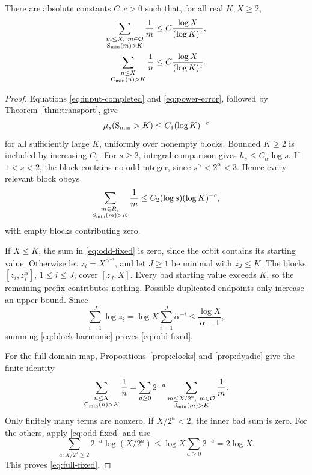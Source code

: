 \begin{theorem}
\label{thm:fixed}
There are absolute constants $C,c>0$ such that, for all real $K,X\geq2$,
\begin{align}
 \sum_{\substack{m\leq X,\ m\in\mathcal O\\\mathrm S_{\min}(m)>K}}\frac1m
 &\leq C\frac{\log X}{(\log K)^c},\label{eq:odd-fixed}\\
 \sum_{\substack{n\leq X\\\mathrm C_{\min}(n)>K}}\frac1n
 &\leq C\frac{\log X}{(\log K)^c}.\label{eq:full-fixed}
\end{align}
\end{theorem}
\begin{proof}
Equations \eqref{eq:input-completed} and \eqref{eq:power-error}, followed
by Theorem~\ref{thm:transport}, give
\[
 \mu_s(\mathrm S_{\min}>K)\leq C_1(\log K)^{-c}
\]
for all sufficiently large $K$, uniformly over nonempty blocks.  Bounded
$K\geq2$ is included by increasing $C_1$.
For $s\geq2$, integral comparison gives $h_s\leq C_\alpha\log s$.
If $1<s<2$, the block contains no odd integer, since $s^\alpha<2^\alpha<3$.
Hence every relevant block obeys
\begin{equation}\label{eq:block-harmonic}
 \sum_{\substack{m\in R_s\\\mathrm S_{\min}(m)>K}}\frac1m
 \leq C_2(\log s)(\log K)^{-c},
\end{equation}
with empty blocks contributing zero.

If $X\leq K$, the sum in \eqref{eq:odd-fixed} is zero, since the orbit
contains its starting value.  Otherwise let $z_i=X^{\alpha^{-i}}$, and
let $J\geq1$ be minimal with $z_J\leq K$.  The blocks
$[z_i,z_i^\alpha]$, $1\leq i\leq J$, cover $[z_J,X]$.
Every bad starting value exceeds $K$, so the remaining prefix contributes
nothing.  Possible duplicated endpoints only increase an upper bound.
Since
\[
 \sum_{i=1}^J\log z_i
 =\log X\sum_{i=1}^J\alpha^{-i}
 \leq\frac{\log X}{\alpha-1},
\]
summing \eqref{eq:block-harmonic} proves \eqref{eq:odd-fixed}.

For the full-domain map, Propositions~\ref{prop:clocks} and
\ref{prop:dyadic} give the finite identity
\[
 \sum_{\substack{n\leq X\\\Col_{\min}(n)>K}}\frac1n
 =\sum_{a\geq0}2^{-a}
   \sum_{\substack{m\leq X/2^a,\ m\in\Opos\\\Syr_{\min}(m)>K}}\frac1m.
\]
Only finitely many terms are nonzero.  If $X/2^a<2$, the inner bad sum is
zero.  For the others, apply \eqref{eq:odd-fixed} and use
\[
 \sum_{a:X/2^a\geq2}2^{-a}\log(X/2^a)
 \leq\log X\sum_{a\geq0}2^{-a}=2\log X.
\]
This proves \eqref{eq:full-fixed}.
\end{proof}

